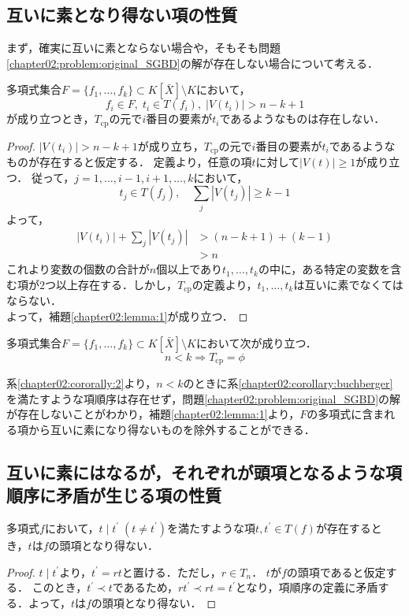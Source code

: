 \subsection{互いに素となり得ない項の性質}
まず，確実に互いに素とならない場合や，そもそも問題\ref{chapter02:problem:original_SGBD}の解が存在しない場合について考える．
\begin{lemma}
	\label{chapter02:lemma:1}
	多項式集合$F=\{ f_1, \dots, f_k \} \subset K[\bar{X}]\setminus K$において，
	$$f_i \in F, \; t_i \in T(f_i), \; |V(t_i)| > n - k + 1$$
	が成り立つとき，$T_{\mathrm{cp}}$の元で$i$番目の要素が$t_i$であるようなものは存在しない．
\end{lemma}
\begin{proof}
	$|V(t_i)| > n - k + 1$が成り立ち，$T_{\mathrm{cp}}$の元で$i$番目の要素が$t_i$であるようなものが存在すると仮定する．
	定義より，任意の項$t$に対して$|V(t)| \ge 1$が成り立つ．
	従って，$j = 1, \dots, i-1, i+1, \dots, k$において，
	$$t_j \in T(f_j), \quad \sum_j |V(t_j)| \ge k -1$$
	よって，
	\begin{align*}
		|V(t_i)| + \sum_j|V(t_j)| &> (n - k + 1) + (k - 1)\\
		& > n
	\end{align*}
	これより変数の個数の合計が$n$個以上であり$t_1, \dots, t_k$の中に，ある特定の変数を含む項が$2$つ以上存在する．しかし，$T_{\mathrm{cp}}$の定義より，$t_1,\dots, t_k$は互いに素でなくてはならない．\\
	よって，補題\ref{chapter02:lemma:1}が成り立つ．
\end{proof}
\begin{corollary}
	\label{chapter02:cororally:2}
	多項式集合$F=\{ f_1, \dots, f_k \} \subset K[\bar{X}]\setminus K$において次が成り立つ．
	$$n<k \Longrightarrow T_{\mathrm{cp}}= \phi$$
\end{corollary}
系\ref{chapter02:cororally:2}より，$n<k$のときに系\ref{chapter02:corollary:buchberger}を満たすような項順序は存在せず，問題\ref{chapter02:problem:original_SGBD}の解が存在しないことがわかり，補題\ref{chapter02:lemma:1}より，$F$の多項式に含まれる項から互いに素になり得ないものを除外することができる．
\subsection{互いに素にはなるが，それぞれが頭項となるような項順序に矛盾が生じる項の性質}
\begin{lemma}
	\label{chapter02:lemma:3}
	多項式$f$において，$t \mid t^\prime\; (t \ne t^\prime)$を満たすような項$t, t^\prime \in T(f)$が存在するとき，$t$は$f$の頭項となり得ない．
\end{lemma}
\begin{proof}
	$t \mid t^\prime$より，$t^\prime = rt$と置ける．ただし，$r\in T_n$．
	$t$が$f$の頭項であると仮定する．
	このとき，$t^\prime \prec t$であるため，$rt^\prime \prec rt = t^\prime$となり，項順序の定義に矛盾する．よって，$t$は$f$の頭項となり得ない．
\end{proof}

